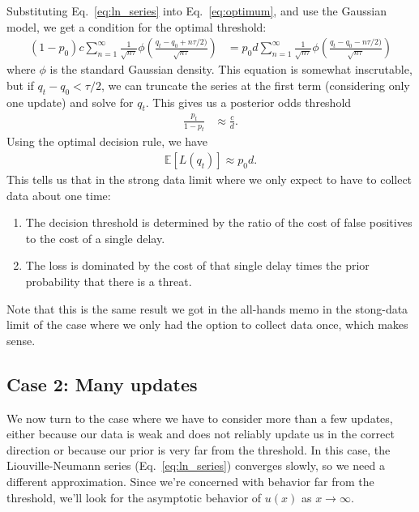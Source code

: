 \documentclass[12pt, letterpaper]{article}
\begin{document}
Substituting Eq.~\ref{eq:ln_series} into Eq.~\ref{eq:optimum}, and use the Gaussian model, we get a condition for the optimal threshold:
\begin{align}
    (1 - p_0) c \sum_{n=1}^{\infty} \frac{1}{\sqrt{n\tau}} \phi\left(\frac{q_t - q_0 + n \tau / 2)}{\sqrt{n\tau}} \right) & = 
    p_0 d \sum_{n=1}^{\infty} \frac{1}{\sqrt{n\tau}} \phi\left(\frac{q_t - q_0 - n \tau / 2)}{\sqrt{n\tau}} \right)
\end{align}
where $\phi$ is the standard Gaussian density.
This equation is somewhat inscrutable, but if $q_t - q_0 < \tau / 2$, we can truncate the series at the first term (considering only one update) and solve for $q_t$.
This gives us a posterior odds threshold
\begin{align}
    \frac{p_t}{1-p_t} & \approx \frac{c}{d}.
\end{align}
Using the optimal decision rule, we have
\begin{align}
    \mathbb{E}[L(q_t)] \approx p_0 d.
\end{align}
This tells us that in the strong data limit where we only expect to have to collect data about one time:
\begin{enumerate}
    \item The decision threshold is determined by the ratio of the cost of false positives to the cost of a single delay.
    \item The loss is dominated by the cost of that single delay times the prior probability that there is a threat.
\end{enumerate}
Note that this is the same result we got in the all-hands memo in the stong-data limit of the case where we only had the option to collect data once, which makes sense.

\subsection{Case 2: Many updates}

We now turn to the case where we have to consider more than a few updates, either because our data is weak and does not reliably update us in the correct direction or because our prior is very far from the threshold.
In this case, the Liouville-Neumann series (Eq.~\ref{eq:ln_series}) converges slowly, so we need a different approximation.
Since we're concerned with behavior far from the threshold, we'll look for the asymptotic behavior of $u(x)$ as $x \to \infty$.
\end{document}
